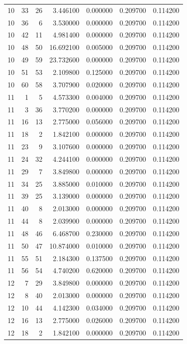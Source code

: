 \begin{table}
\begin{tabular}{rrrrrrr}
10 & 33 & 26 & 3.446100 & 0.000000 & 0.209700 & 0.114200 \\
10 & 36 & 6 & 3.530000 & 0.000000 & 0.209700 & 0.114200 \\
10 & 42 & 11 & 4.981400 & 0.000000 & 0.209700 & 0.114200 \\
10 & 48 & 50 & 16.692100 & 0.005000 & 0.209700 & 0.114200 \\
10 & 49 & 59 & 23.732600 & 0.000000 & 0.209700 & 0.114200 \\
10 & 51 & 53 & 2.109800 & 0.125000 & 0.209700 & 0.114200 \\
10 & 60 & 58 & 3.707900 & 0.020000 & 0.209700 & 0.114200 \\
11 & 1 & 5 & 4.573300 & 0.004000 & 0.209700 & 0.114200 \\
11 & 3 & 36 & 3.770200 & 0.000000 & 0.209700 & 0.114200 \\
11 & 16 & 13 & 2.775000 & 0.056000 & 0.209700 & 0.114200 \\
11 & 18 & 2 & 1.842100 & 0.000000 & 0.209700 & 0.114200 \\
11 & 23 & 9 & 3.107600 & 0.000000 & 0.209700 & 0.114200 \\
11 & 24 & 32 & 4.244100 & 0.000000 & 0.209700 & 0.114200 \\
11 & 29 & 7 & 3.849800 & 0.000000 & 0.209700 & 0.114200 \\
11 & 34 & 25 & 3.885000 & 0.010000 & 0.209700 & 0.114200 \\
11 & 39 & 25 & 3.139000 & 0.000000 & 0.209700 & 0.114200 \\
11 & 40 & 8 & 2.013000 & 0.000000 & 0.209700 & 0.114200 \\
11 & 44 & 8 & 2.039900 & 0.000000 & 0.209700 & 0.114200 \\
11 & 48 & 46 & 6.468700 & 0.230000 & 0.209700 & 0.114200 \\
11 & 50 & 47 & 10.874000 & 0.010000 & 0.209700 & 0.114200 \\
11 & 55 & 51 & 2.184300 & 0.137500 & 0.209700 & 0.114200 \\
11 & 56 & 54 & 4.740200 & 0.620000 & 0.209700 & 0.114200 \\
12 & 7 & 29 & 3.849800 & 0.000000 & 0.209700 & 0.114200 \\
12 & 8 & 40 & 2.013000 & 0.000000 & 0.209700 & 0.114200 \\
12 & 10 & 44 & 4.142300 & 0.034000 & 0.209700 & 0.114200 \\
12 & 16 & 13 & 2.775000 & 0.026000 & 0.209700 & 0.114200 \\
12 & 18 & 2 & 1.842100 & 0.000000 & 0.209700 & 0.114200 \\

\end{tabular}
\end{table}
